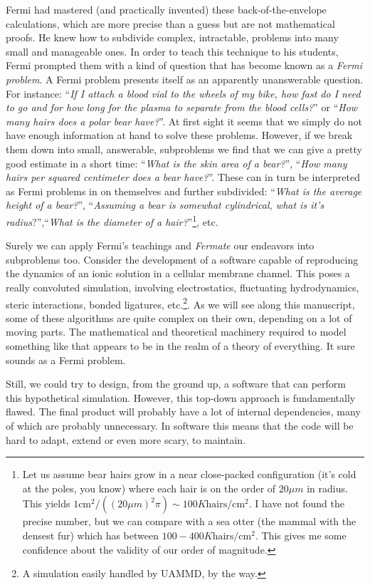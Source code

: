 \documentclass[ twoside,openright,titlepage,numbers=noenddot,%
headinclude,footinclude,cleardoublepage=empty,abstract=on,
BCOR=5mm,paper=a4,fontsize=11pt, dvipsnames
]{scrreprt}
\newcommand{\uammd}{\gls{UAMMD}\xspace}
\begin{document}
Fermi had mastered (and practically invented) these back-of-the-envelope calculations, which are more precise than a guess but are not mathematical proofs. He knew how to subdivide complex, intractable, problems into many small and manageable ones. In order to teach this technique to his students, Fermi prompted them with a kind of question that has become known as a \emph{Fermi problem}. A Fermi problem presents itself as an apparently unanswerable question. For instance: ``\emph{If I attach a blood vial to the wheels of my bike, how fast do I need to go and for how long for the plasma to separate from the blood cells?}'' or ``\emph{How many hairs does a polar bear have?}''. At first sight it seems that we simply do not have enough information at hand to solve these problems. However, if we break them down into small, answerable, subproblems we find that we can give a pretty good estimate in a short time: ``\emph{What is the skin area of a bear?}'', ``\emph{How many hairs per squared centimeter does a bear have?}''. These can in turn be interpreted as Fermi problems in on themselves and further subdivided: ``\emph{What is the average height of a bear?}'', ``\emph{Assuming a bear is somewhat cylindrical, what is it's radius}?'',``\emph{What is the diameter of a hair?}''\footnote{Let us assume bear hairs grow in a near close-packed configuration (it's cold at the poles, you know) where each hair is on the order of $20\mu m$ in radius. This yields $1\text{cm}^2/((20\mu m)^2\pi) \sim 100K \text{hairs}/\text{cm}^2$. I have not found the precise number, but we can compare with a sea otter (the mammal with the densest fur) which has between $100-400K \text{hairs}/\text{cm}^2$. This gives me some confidence about the validity of our order of magnitude.}, etc.

Surely we can apply Fermi's teachings and \emph{Fermate} our endeavors into subproblems too.
Consider the development of a software capable of reproducing the dynamics of an ionic solution in a cellular membrane channel. This poses a really convoluted simulation, involving electrostatics, fluctuating hydrodynamics, steric interactions, bonded ligatures, etc.\footnote{A simulation easily handled by \uammd, by the way.}. As we will see along this manuscript, some of these algorithms are quite complex on their own, depending on a lot of moving parts. The mathematical and theoretical machinery required to model something like that appears to be in the realm of a theory of everything. It sure sounds as a Fermi problem.

Still, we could try to design, from the ground up, a software that can perform this hypothetical simulation. 
However, this top-down approach is fundamentally flawed. The final product will probably have a lot of internal dependencies, many of which are probably unnecessary. In software this means that the code will be hard to adapt, extend or even more scary, to maintain.
\end{document}
